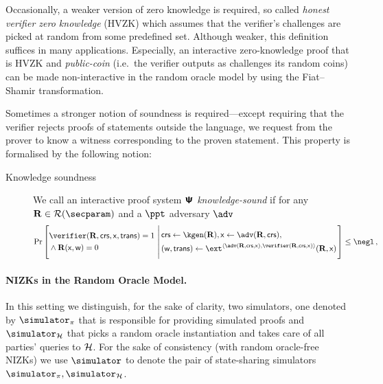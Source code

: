 \let\accentvec\vec \documentclass[runningheads]{llncs}
\begin{document}
	Occasionally, a weaker version of zero knowledge is required, so called
	\emph{honest verifier zero knowledge} (HVZK) which assumes that the
	verifier's challenges are picked at random from some predefined set.
	Although weaker, this definition suffices in many applications. Especially,
	an interactive zero-knowledge proof that is HVZK and \emph{public-coin}
	(i.e.~the verifier outputs as challenges its random coins) can be made
	non-interactive in the random oracle model by using the Fiat--Shamir
	transformation.
	
	Sometimes a stronger notion of soundness is required---except requiring that the verifier rejects proofs of statements outside the language, we request from the prover to know a witness corresponding to the proven statement. This property is formalised by the following notion:
\begin{description}
	\item[Knowledge soundness] We call an interactive proof system $\bm{\mathsf{\Psi}}$
			\emph{knowledge-sound} if for any $\REL \in \RELGEN(\secparam)$ and a $\ppt$ adversary $\adv$
	\[
	\Pr\left[
		\begin{aligned}
			& \verifier(\REL, \crs, \inp, \trans) = 1 \\
			& \land \REL(\inp, \wit) = 0
	 \end{aligned}
	  \,\left|\,
	 \begin{aligned}
		 & \crs \gets \kgen(\REL), \inp \gets \adv(\REL, \crs), \\
		 & (\wit, \trans) \gets \ext^{\ip{\adv(\REL, \crs, \inp)}{\verifier(\REL, \crs, \inp)}}(\REL, \inp)
	 \end{aligned}
	 \vphantom{\begin{aligned}
		 \adv (\trans) = 1, \\
		 \text{if $\trans{}$ is accepting} \\
		 \pcind \text{then $\REL(\inp, \wit)$}
	 \end{aligned}}\right.
	 \right] \leq \negl\,,
 \]
\end{description}

\paragraph{NIZKs in the Random Oracle Model.}
In this setting we distinguish, for the sake of clarity, two simulators, one denoted by $\simulator_\zkproof$ that is responsible for providing simulated proofs and $\simulator_\ro$ that picks a random oracle instantiation and takes care of all parties' queries to $\mathcal{H}$.
For the sake of consistency (with random oracle-free NIZKs) we use $\simulator$
to denote the pair of state-sharing simulators $\simulator_\zkproof,
\simulator_\ro$.
\end{document}
